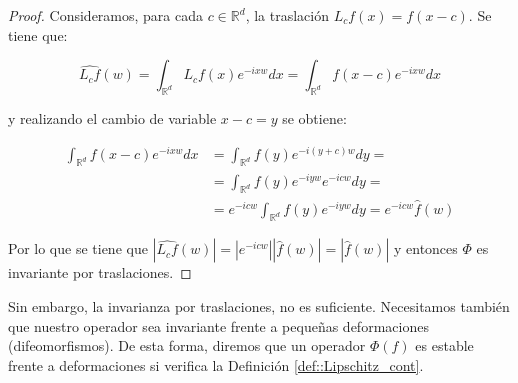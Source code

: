 \begin{proof}
    \noindent Consideramos, para cada $c \in \mathbb{R}^d$, la traslación $L_cf(x)=f(x-c)$. Se tiene que:  
    
    $$\widehat{L_cf}(w)=\int_{\mathbb{R}^d}{L_cf(x) e^{-ixw} dx}=\int_{\mathbb{R}^d}{f(x-c)e^{-ixw}dx}$$
    
    \noindent y realizando el cambio de variable $x-c=y$ se obtiene: 
    
    \begin{align*}
        \int_{\mathbb{R}^d}{f(x-c)e^{-ixw}dx} &= \int_{\mathbb{R}^d}{f(y)e^{-i(y+c)w}dy}= \\      &=\int_{\mathbb{R}^d}{f(y)e^{-iyw}e^{-icw}dy}= \\ &=e^{-icw}\int_{\mathbb{R}^d}{f(y)e^{-iyw}dy}=e^{-icw}\widehat{f}(w)
    \end{align*}
    
    \noindent Por lo que se tiene que $|\widehat{L_cf}(w)|=|e^{-icw}| |\widehat{f}(w)|=|\widehat{f}(w)|$ y entonces $\Phi$ es invariante por traslaciones. \qedhere
\end{proof}

\medskip
    
\noindent Sin embargo, la invarianza por traslaciones, no es suficiente. Necesitamos también que nuestro operador sea invariante frente a pequeñas deformaciones (difeomorfismos). De esta forma, diremos que un operador $\Phi(f)$ es estable frente a deformaciones si verifica la Definición \ref{def::Lipschitz_cont}.

